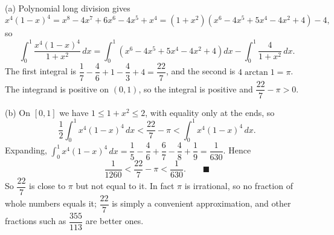 (a) Polynomial long division gives
\[
x^4(1-x)^4=x^8-4x^7+6x^6-4x^5+x^4=(1+x^2)\left(x^6-4x^5+5x^4-4x^2+4\right)-4 ,
\]
so
\[
\int_0^1\dfrac{x^4(1-x)^4}{1+x^2}\,dx=\int_0^1\left(x^6-4x^5+5x^4-4x^2+4\right)dx-\int_0^1\dfrac{4}{1+x^2}\,dx .
\]
The first integral is $\dfrac{1}{7}-\dfrac{4}{6}+1-\dfrac{4}{3}+4=\dfrac{22}{7}$, and the second is $4\arctan1=\pi$. The integrand is positive on $(0,1)$, so the integral is positive and $\dfrac{22}{7}-\pi>0$.

(b) On $[0,1]$ we have $1\le1+x^2\le2$, with equality only at the ends, so
\[
\dfrac{1}{2}\int_0^1x^4(1-x)^4\,dx<\dfrac{22}{7}-\pi<\int_0^1x^4(1-x)^4\,dx .
\]
Expanding, $\int_0^1x^4(1-x)^4\,dx=\dfrac{1}{5}-\dfrac{4}{6}+\dfrac{6}{7}-\dfrac{4}{8}+\dfrac{1}{9}=\dfrac{1}{630}$. Hence
\[
\dfrac{1}{1260}<\dfrac{22}{7}-\pi<\dfrac{1}{630}. \qquad\blacksquare
\]
So $\dfrac{22}{7}$ is close to $\pi$ but not equal to it. In fact $\pi$ is irrational, so no fraction of whole numbers equals it; $\dfrac{22}{7}$ is simply a convenient approximation, and other fractions such as $\dfrac{355}{113}$ are better ones.
